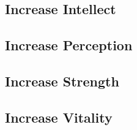 \subsection{Increase Intellect}\label{subsec:increaseIntellect}

\subsection{Increase Perception}\label{subsec:increasePerception}

\subsection{Increase Strength}\label{subsec:increaseStrength}

\subsection{Increase Vitality}\label{subsec:increaseVitality}